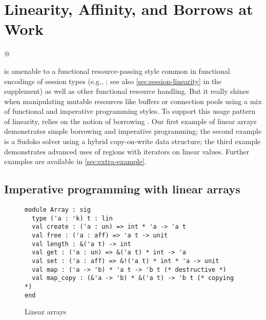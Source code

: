 \section{Linearity, Affinity, and Borrows at Work}
\label{motivation}

\lstMakeShortInline[keepspaces,basicstyle=\small\ttfamily]@

\lang{} is amenable to a functional resource-passing style
common in functional encodings of session types (e.g.,
\cite{DBLP:journals/jfp/Padovani17}; see also
\cref{sec:session-linearity} in the supplement) as well as other
functional resource handling. But it really shines
when manipulating mutable resources like buffers or connection pools
using a mix of functional and imperative programming styles.
%
To support this usage pattern of linearity, \lang{} relies on
the notion of borrowing \cite{DBLP:conf/popl/BoylandR05}. Our first
example of linear arrays demonstrates simple borrowing and
imperative programming; the second example is a Sudoko solver using a
hybrid copy-on-write data structure; the third example demonstrates advanced uses
of regions with iterators on linear values.
Further examples are available in \cref{sec:extra-example}.

\subsection{Imperative programming with linear arrays}
\label{sec:imper-progr}

\begin{figure}[tp]
  \centering
\begin{lstlisting}
module Array : sig
  type ('a : 'k) t : lin
  val create : ('a : un) => int * 'a -> 'a t
  val free : ('a : aff) => 'a t -> unit
  val length : &('a t) -> int
  val get : ('a : un) => &('a t) * int -> 'a
  val set : ('a : aff) => &!('a t) * int * 'a -> unit
  val map : ('a -> 'b) * 'a t -> 'b t (* destructive *)
  val map_copy : (&'a -> 'b) * &('a t) -> 'b t (* copying *)
end
\end{lstlisting}
  \vspace{-15pt}
  \caption{Linear arrays}
  \label{ex:array}
  \label{sig:array}
  \vspace{-10pt}
\end{figure}

